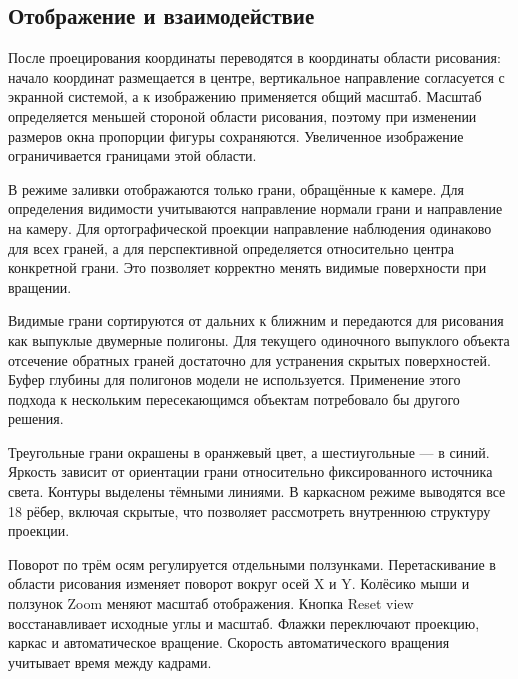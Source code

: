 \subsection{Отображение и взаимодействие}

После проецирования координаты переводятся в координаты области рисования: начало координат размещается в центре, вертикальное направление согласуется с экранной системой, а к изображению применяется общий масштаб. Масштаб определяется меньшей стороной области рисования, поэтому при изменении размеров окна пропорции фигуры сохраняются. Увеличенное изображение ограничивается границами этой области.

В режиме заливки отображаются только грани, обращённые к камере. Для определения видимости учитываются направление нормали грани и направление на камеру. Для ортографической проекции направление наблюдения одинаково для всех граней, а для перспективной определяется относительно центра конкретной грани. Это позволяет корректно менять видимые поверхности при вращении.

Видимые грани сортируются от дальних к ближним и передаются для рисования как выпуклые двумерные полигоны. Для текущего одиночного выпуклого объекта отсечение обратных граней достаточно для устранения скрытых поверхностей. Буфер глубины для полигонов модели не используется. Применение этого подхода к нескольким пересекающимся объектам потребовало бы другого решения.

Треугольные грани окрашены в оранжевый цвет, а шестиугольные — в синий. Яркость зависит от ориентации грани относительно фиксированного источника света. Контуры выделены тёмными линиями. В каркасном режиме выводятся все 18 рёбер, включая скрытые, что позволяет рассмотреть внутреннюю структуру проекции.

Поворот по трём осям регулируется отдельными ползунками. Перетаскивание в области рисования изменяет поворот вокруг осей X и Y. Колёсико мыши и ползунок Zoom меняют масштаб отображения. Кнопка Reset view восстанавливает исходные углы и масштаб. Флажки переключают проекцию, каркас и автоматическое вращение. Скорость автоматического вращения учитывает время между кадрами.

